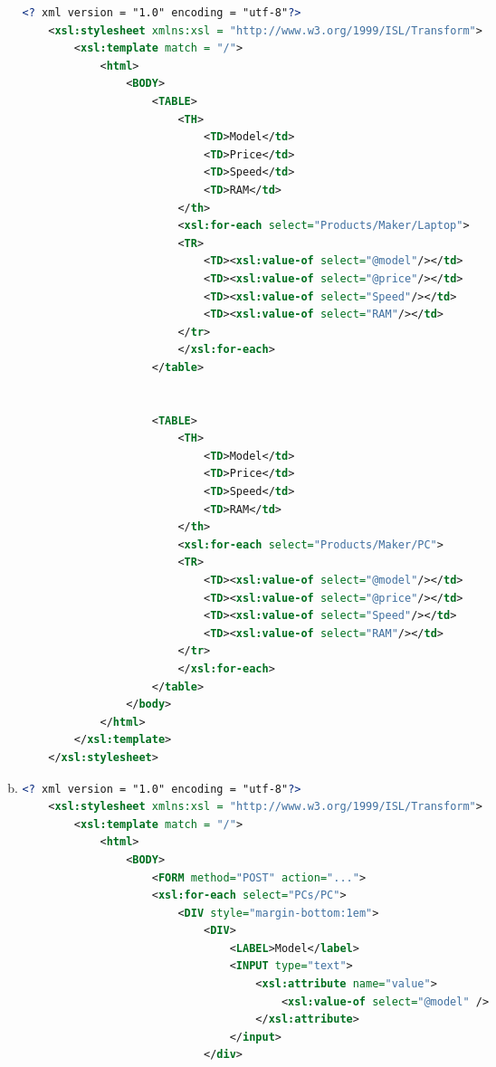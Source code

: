 \documentclass[12pt]{article}
\begin{document}
\begin{enumerate}[1.]
\begin{enumerate}[a)]
    \begin{lstlisting}[language=XML]
    <? xml version = "1.0" encoding = "utf-8"?>
    <xsl:stylesheet xmlns:xsl = "http://www.w3.org/1999/ISL/Transform">
        <xsl:template match = "/">
            <html>
                <BODY>
                    <TABLE>
                        <TH>
                            <TD>Model</td>
                            <TD>Price</td>
                            <TD>Speed</td>
                            <TD>RAM</td>
                        </th>
                        <xsl:for-each select="Products/Maker/Laptop">
                        <TR>
                            <TD><xsl:value-of select="@model"/></td>
                            <TD><xsl:value-of select="@price"/></td>
                            <TD><xsl:value-of select="Speed"/></td>
                            <TD><xsl:value-of select="RAM"/></td>
                        </tr>
                        </xsl:for-each>
                    </table>


                    <TABLE>
                        <TH>
                            <TD>Model</td>
                            <TD>Price</td>
                            <TD>Speed</td>
                            <TD>RAM</td>
                        </th>
                        <xsl:for-each select="Products/Maker/PC">
                        <TR>
                            <TD><xsl:value-of select="@model"/></td>
                            <TD><xsl:value-of select="@price"/></td>
                            <TD><xsl:value-of select="Speed"/></td>
                            <TD><xsl:value-of select="RAM"/></td>
                        </tr>
                        </xsl:for-each>
                    </table>
                </body>
            </html>
        </xsl:template>
    </xsl:stylesheet>
    \end{lstlisting}

        \item

    \begin{lstlisting}[language=XML]
    <? xml version = "1.0" encoding = "utf-8"?>
    <xsl:stylesheet xmlns:xsl = "http://www.w3.org/1999/ISL/Transform">
        <xsl:template match = "/">
            <html>
                <BODY>
                    <FORM method="POST" action="...">
                    <xsl:for-each select="PCs/PC">
                        <DIV style="margin-bottom:1em">
                            <DIV>
                                <LABEL>Model</label>
                                <INPUT type="text">
                                    <xsl:attribute name="value">
                                        <xsl:value-of select="@model" />
                                    </xsl:attribute>
                                </input>
                            </div>


\end{lstlisting}
\end{enumerate}
\end{enumerate}
\end{document}
